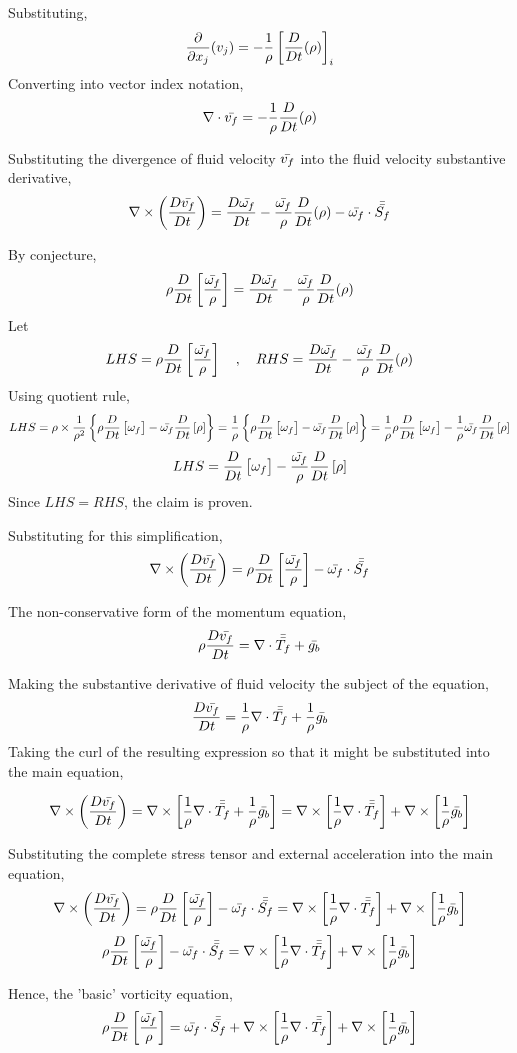 \documentclass[a4paper, 12pt]{report}
\begin{document}
\begin{center}
Substituting,
$$\frac{\partial}{\partial x_j}(v_j) = -\frac{1}{\rho}\left[\frac{D }{Dt}(\rho)\right]_i$$
Converting into vector index notation,
$$\nabla\cdot\bar{v_f} = -\frac{1}{\rho}\frac{D }{Dt}(\rho)$$

Substituting the divergence of fluid velocity $\bar{v_f}$ into the fluid velocity substantive derivative,
$$\nabla\times\left(\frac{D \bar{v_f}}{Dt}\right) = \frac{D \bar{\omega_f}}{Dt} - \frac{\bar{\omega_f}}{\rho}\frac{D }{Dt}(\rho) - \bar{\omega_f} \cdot \bar{\bar{S_f}}$$

By conjecture,
$$\rho\frac{D}{Dt}\left[\frac{\bar{\omega_f}}{\rho}\right] = \frac{D \bar{\omega_f}}{Dt} - \frac{\bar{\omega_f}}{\rho}\frac{D }{Dt}(\rho)$$
Let
$$LHS = \rho\frac{D}{Dt}\left[\frac{\bar{\omega_f}}{\rho}\right] \quad,\quad RHS = \frac{D \bar{\omega_f}}{Dt} - \frac{\bar{\omega_f}}{\rho}\frac{D }{Dt}(\rho)$$
Using quotient rule,
$$LHS = \rho\times\frac{1}{\rho^2}\left\{\rho\frac{D}{Dt}\left[\omega_f\right] - \bar{\omega_f}\frac{D}{Dt}\left[\rho\right]\right\} = \frac{1}{\rho}\left\{\rho\frac{D}{Dt}\left[\omega_f\right] - \bar{\omega_f}\frac{D}{Dt}\left[\rho\right]\right\} = \frac{1}{\rho}\rho\frac{D}{Dt}\left[\omega_f\right] - \frac{1}{\rho}\bar{\omega_f}\frac{D}{Dt}\left[\rho\right]$$
$$LHS = \frac{D}{Dt}\left[\omega_f\right] - \frac{\bar{\omega_f}}{\rho}\frac{D}{Dt}\left[\rho\right]$$
Since $LHS = RHS$, the claim is proven. 

Substituting for this simplification,
$$\nabla\times\left(\frac{D \bar{v_f}}{Dt}\right) = \rho\frac{D}{Dt}\left[\frac{\bar{\omega_f}}{\rho}\right] - \bar{\omega_f} \cdot \bar{\bar{S_f}}$$

The non-conservative form of the momentum equation,
$$\rho \frac{D\bar{v_f}}{Dt} = \nabla\cdot\bar{\bar{T_f}} + \bar{g_b}$$

Making the substantive derivative of fluid velocity the subject of the equation,
$$\frac{D\bar{v_f}}{Dt} = \frac{1}{\rho}\nabla\cdot\bar{\bar{T_f}} + \frac{1}{\rho}\bar{g_b}$$
Taking the curl of the resulting expression so that it might be substituted into the main equation,

$$\nabla\times \left(\frac{D\bar{v_f}}{Dt}\right) = \nabla\times\left[\frac{1}{\rho}\nabla\cdot\bar{\bar{T_f}} + \frac{1}{\rho}\bar{g_b}\right] = \nabla\times\left[\frac{1}{\rho}\nabla\cdot\bar{\bar{T_f}}\right] + \nabla\times\left[\frac{1}{\rho}\bar{g_b}\right]$$

Substituting the complete stress tensor and external acceleration into the main equation,
$$\nabla\times\left(\frac{D \bar{v_f}}{Dt}\right) = \rho\frac{D}{Dt}\left[\frac{\bar{\omega_f}}{\rho}\right] - \bar{\omega_f} \cdot \bar{\bar{S_f}} = \nabla\times\left[\frac{1}{\rho}\nabla\cdot\bar{\bar{T_f}}\right] + \nabla\times\left[\frac{1}{\rho}\bar{g_b}\right]$$
$$\rho\frac{D}{Dt}\left[\frac{\bar{\omega_f}}{\rho}\right] - \bar{\omega_f} \cdot \bar{\bar{S_f}} = \nabla\times\left[\frac{1}{\rho}\nabla\cdot\bar{\bar{T_f}}\right] + \nabla\times\left[\frac{1}{\rho}\bar{g_b}\right]$$

Hence, the 'basic' vorticity equation,
$$\rho\frac{D}{Dt}\left[\frac{\bar{\omega_f}}{\rho}\right] = \bar{\omega_f} \cdot \bar{\bar{S_f}} + \nabla\times\left[\frac{1}{\rho}\nabla\cdot\bar{\bar{T_f}}\right] + \nabla\times\left[\frac{1}{\rho}\bar{g_b}\right]$$



\end{center}
\end{document}
